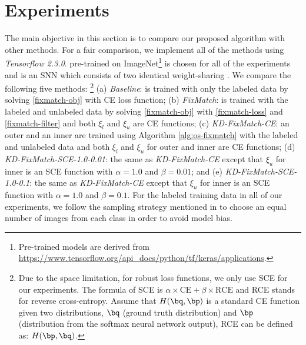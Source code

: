 \documentclass{article}
\begin{document}
\section{Experiments}
\label{sec:exps}

The main objective in this section is to compare our proposed algorithm with other methods.
For a fair comparison, we implement all of the methods using {\sl Tensorflow 2.3.0}.
 \cite{MT19a} pre-trained on {\sf ImageNet}\footnote{
Pre-trained models are derived from \url{https://www.tensorflow.org/api_docs/python/tf/keras/applications}.
}
is chosen for all of the experiments and
 is an SNN which consists of two identical weight-sharing .
We compare the following five methods:
\footnote{
    Due to the space limitation, for robust loss functions, we only use SCE for our experiments.
    The formula of SCE is $\alpha \times \text{CE} + \beta \times \text{RCE}$ and
    RCE stands for reverse cross-entropy.
    Assume that $H(\bq, \bp)$ is a standard CE function given two distributions, $\bq$ (ground truth distribution) and $\bp$ (distribution from the softmax neural network output),
    RCE can be defined as: $H(\bp, \bq)$.
}
(a) {\sl Baseline}:  is trained with only the labeled data by solving \eqref{fixmatch-obj} with CE loss function;
(b) {\sl FixMatch}:  is trained with the labeled and unlabeled data by solving \eqref{fixmatch-obj} with \eqref{fixmatch-loss} and \eqref{fixmatch-filter} and both $\xi_l$ and $\xi_u$ are CE functions;
(c) {\sl KD-FixMatch-CE}: an outer and an inner  are trained using Algorithm \ref{alg:os-fixmatch} with the labeled and unlabeled data 
        and both $\xi_l$ and $\xi_u$ for outer and inner  are CE functions;
(d) {\sl KD-FixMatch-SCE-1.0-0.01}: the same as {\sl KD-FixMatch-CE} except that
        $\xi_u$ for inner  is an SCE function with $\alpha = 1.0$ and $\beta = 0.01$; and
(e) {\sl KD-FixMatch-SCE-1.0-0.1}: the same as {\sl KD-FixMatch-CE} except that
        $\xi_u$ for inner  is an SCE function with $\alpha = 1.0$ and $\beta = 0.1$.
For the labeled training data in all of our experiments, we follow the sampling strategy mentioned in \cite{KS20a} to choose an equal number of images from each class in order to avoid model bias.
\end{document}
